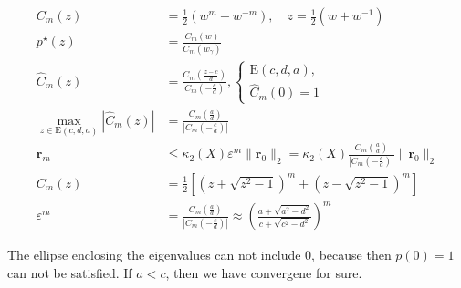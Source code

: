 \begin{align*}
    C_m(z)                                        & = \frac{1}{2}(w^m + w^{-m}), \quad z = \frac{1}{2}(w + w^{-1})                                                          \\
    p^\star(z)                                    & = \frac{C_m(w)}{C_m(w_\gamma)}                                                                                          \\
    \hat{C}_m(z)                                  & = \frac{C_m(\frac{z - c}{d})}{C_m(-\frac{c}{d})},
    \begin{cases}
        \mathrm{E}(c,d,a), \\
        \hat{C}_m(0) = 1
    \end{cases}                                                                                                                                   \\
    \max_{z \in \mathrm{E}(c,d,a)} |\hat{C}_m(z)| & = \frac{C_m(\frac{a}{d})}{|C_m(-\frac{c}{d})|}                                                                          \\
    \mathbf{r}_m                                  & \leq \kappa_2(X) \varepsilon^{m} \|\mathbf{r}_0\|_2 = \kappa_2(X) \frac{C_m(\frac{a}{d})}{|C_m(-\frac{c}{d})|} \|\mathbf{r}_0\|_2                                           \\
    C_m(z)                                        & = \frac{1}{2}\left[\left(z + \sqrt{z^2 - 1}\right)^m + \left(z - \sqrt{z^2 - 1}\right)^m\right]                         \\
    \varepsilon^m                                 & = \frac{C_m(\frac{a}{d})}{|C_m(-\frac{c}{d})|} \approx \left(\frac{a + \sqrt{a^2 - d^2}}{c + \sqrt{c^2 - d^2}}\right)^m
\end{align*}

The ellipse enclosing the eigenvalues can not include $0$, because then $p(0) = 1$ can not be satisfied.
If $a < c$, then we have convergene for sure.




